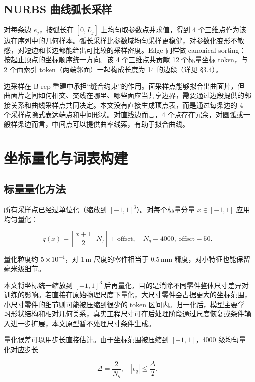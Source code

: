 \subsection{NURBS 曲线弧长采样}

对每条边 $e_j$，按弧长在 $[0, L_j]$ 上均匀取参数点并求值，得到 4 个三维点作为该边在序列中的几何样本。弧长采样比参数域均匀采样更稳健，对参数化变形不敏感，对短边和长边都能给出可比较的采样密度。Edge 同样做 canonical sorting：按起止顶点的坐标顺序统一方向。该 4 个三维点共贡献 12 个标量坐标 token，与 2 个面索引 token（两端邻面）一起构成长度为 14 的边段（详见 §3.4）。

边采样在 B-rep 重建中承担“缝合约束”的作用。面采样点能够拟合出曲面片，但曲面片之间如何相交、交线在哪里、哪些面应当共享边界，需要通过边段提供的邻接关系和曲线采样点共同决定。本文没有直接生成顶点表，而是通过每条边的 4 个采样点隐式表达端点和中间形状。对直线边而言，4 个点存在冗余，对圆弧或一般样条边而言，中间点可以提供曲率线索，有助于拟合曲线。


\section{坐标量化与词表构建}

\subsection{标量量化方法}

所有采样点已经过单位化（缩放到 $[-1, 1]^3$）。对每个标量分量 $x \in [-1, 1]$ 应用均匀量化：

\begin{equation}
    q(x) = \left\lfloor \frac{x + 1}{2} \cdot N_q \right\rfloor + \text{offset}, \quad N_q = 4000,\ \text{offset} = 50.
    \label{eq:quantization}
\end{equation}

量化粒度约 $5 \times 10^{-4}$，对 1\,m 尺度的零件相当于 0.5\,mm 精度，对小特征也能保留毫米级细节。


本文将坐标统一缩放到 $[-1,1]^3$ 后再量化，目的是消除不同零件整体尺寸差异对训练的影响。若直接在原始物理尺度下量化，大尺寸零件会占据更大的坐标范围，小尺寸零件的细节则可能被压缩到很少的 token 区间内。归一化后，模型主要学习形状结构和相对几何关系，真实工程尺寸可在后处理阶段通过尺度恢复或条件输入进一步扩展，本文原型暂不处理尺寸条件生成。

量化误差可以用步长直接估计。由于坐标范围被压缩到 $[-1,1]$，4000 级均匀量化对应步长

\begin{equation}
    \Delta = \frac{2}{N_q}, \quad |\epsilon_q| \le \frac{\Delta}{2}.
    \label{eq:quantization-error}
\end{equation}

